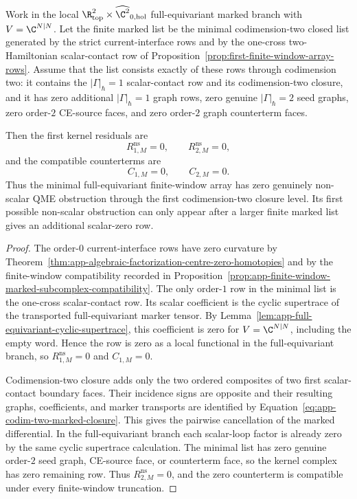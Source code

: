 \begin{thm}
\label{thm:app-minimal-full-equivariant-kernel-vanishing}
  Work in the local
  \(\R^2_{\mathrm{top}}\times\widehat{\C^2}_{0,\mathrm{hol}}\)
  full-equivariant marked branch with \(V=\C^{N|N}\).  Let the finite
  marked list be the minimal codimension-two closed list generated by the
  strict current-interface rows and by the one-cross two-Hamiltonian
  scalar-contact row of
  Proposition~\ref{prop:first-finite-window-array-rows}.  Assume that the
  list consists exactly of these rows through codimension two: it contains
  the \(|\Gamma|_\hbar=1\) scalar-contact row and its codimension-two
  closure, and it has zero additional \(|\Gamma|_\hbar=1\) graph rows,
  zero genuine \(|\Gamma|_\hbar=2\) seed graphs, zero order-\(2\) CE-source
  faces, and zero order-\(2\) graph counterterm faces.

  Then the first kernel residuals are
  \[
    R^{\mathrm{ns}}_{1,M}=0,\qquad
    R^{\mathrm{ns}}_{2,M}=0,
  \]
  and the compatible counterterms are
  \[
    C_{1,M}=0,\qquad C_{2,M}=0 .
  \]
  Thus the minimal full-equivariant finite-window array has zero genuinely
  non-scalar QME obstruction through the first codimension-two closure
  level.  Its first possible non-scalar obstruction can only appear after
  a larger finite marked list gives an additional scalar-zero row.
\end{thm}

\begin{proof}
  The order-\(0\) current-interface rows have zero curvature by
  Theorem~\ref{thm:app-algebraic-factorization-centre-zero-homotopies} and
  by the finite-window compatibility recorded in
  Proposition~\ref{prop:app-finite-window-marked-subcomplex-compatibility}.
  The only order-\(1\) row in the minimal list is the one-cross
  scalar-contact row.  Its scalar coefficient is the cyclic supertrace of
  the transported full-equivariant marker tensor.  By
  Lemma~\ref{lem:app-full-equivariant-cyclic-supertrace}, this coefficient
  is zero for \(V=\C^{N|N}\), including the empty word.  Hence the row is
  zero as a local functional in the full-equivariant branch, so
  \(R^{\mathrm{ns}}_{1,M}=0\) and \(C_{1,M}=0\).

  Codimension-two closure adds only the two ordered composites of two
  first scalar-contact boundary faces.  Their incidence signs are opposite
  and their resulting graphs, coefficients, and marker transports are
  identified by Equation~\eqref{eq:app-codim-two-marked-closure}.  This
  gives the pairwise cancellation of the marked differential.  In the
  full-equivariant branch each scalar-loop factor is already zero by the
  same cyclic supertrace calculation.  The minimal list has zero genuine
  order-\(2\) seed graph, CE-source face, or counterterm face, so the
  kernel complex has zero remaining row.  Thus \(R^{\mathrm{ns}}_{2,M}=0\), and the
  zero counterterm is compatible under every finite-window truncation.
\end{proof}

